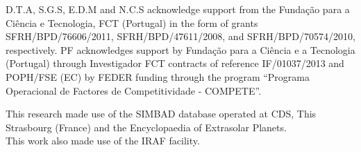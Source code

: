\documentclass{aa}
\begin{document}
\begin{acknowledgements}
D.T.A, S.G.S, E.D.M and N.C.S  acknowledge support from the Funda\c{c}\~ao
para a Ci\^encia e Tecnologia, FCT (Portugal) in the form of grants
SFRH/BPD/76606/2011, SFRH/BPD/47611/2008, and SFRH/BPD/70574/2010,
respectively. PF acknowledges support by Funda\c{c}\~ao para a Ci\^encia
e a Tecnologia (Portugal) through Investigador FCT contracts of
reference IF/01037/2013 and POPH/FSE (EC) by FEDER funding through
the program ``Programa Operacional de Factores de Competitividade -
COMPETE''.

This research made use of the SIMBAD database operated at CDS,
This Strasbourg (France) and the Encyclopaedia of Extrasolar Planets.\\
This work also made use of the IRAF facility.


\end{acknowledgements}






\newpage


\nocite*{}
\end{document}
